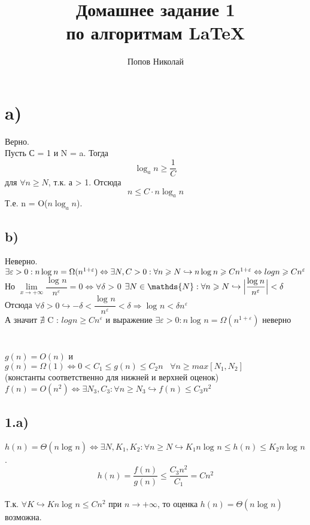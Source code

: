 \documentclass[a4paper,12pt]{article} %
\author{Попов Николай}
\title{Домашнее задание 1\\ по алгоритмам \LaTeX{}}
\begin{document}

\maketitle 
\newpage 

\section{a)}
Верно. \\
	Пусть С = 1 и N = a. Тогда 
	\[\log_{a}{n}\geqslant \dfrac{1}{C}\]
	для $\forall n\geqslant N$, т.к. а > 1.
	Отсюда \[n\leqslant C \cdot n\log_{a}{n}\]
	Т.е. n = O($n\log_{a}{n}$).

\subsection*{b)}
Неверно.\\
$\exists\varepsilon > 0: n\log_{}{n} = \Omega(n^{1+\varepsilon}) \Leftrightarrow \exists N,C > 0 : \forall n \geqslant N \hookrightarrow \\ n\log_{}{n} \geqslant C n^{1+\varepsilon} \Leftrightarrow log_{}{n} \geqslant C n^{\varepsilon}$\\
Но $\lim\limits_{x\to +\infty}\dfrac{\log_{}{n}}{n^\varepsilon} = 0 \Leftrightarrow \forall\delta$ > 0 $\exists N \in \mathds{N}  :\forall n\geqslant N \hookrightarrow \Bigl|\dfrac{\log_{}{n}}{n^\varepsilon}\Bigr|
< \delta$ \\
Отсюда $\forall\delta > 0 \hookrightarrow -\delta < \dfrac{\log_{}{n}}{n^\varepsilon} < \delta \Rightarrow \log_{}{n} < \delta n^\varepsilon$\\
 А значит $ \nexists$ C : $log_{}{n} \geqslant C n^{\varepsilon}$ и выражение $\exists\varepsilon > 0: n\log_{}{n} = \Omega(n^{1+\varepsilon})$ неверно

\section{}
$ g(n)= O(n)$ и $ g(n) = \Omega(1)\Leftrightarrow 0 < C_{1} \leqslant g(n) \leqslant C_{2} n \hspace{10pt} \forall n \geqslant max[N_{1},N_{2}]$\\(константы соответственно для нижней и верхней оценок)\\
$f(n) = O(n^{2}) \Leftrightarrow \exists N_{3} , C_{3}: \forall n  \geqslant N_{3} \hookrightarrow f(n)\leqslant C_{3}n^{2} $
\subsection*{1.a)}
$h(n) = \Theta (n\log_{}{n})\Leftrightarrow \exists N,K_{1},K_{2}:\forall n\geqslant N \hookrightarrow K_{1} n\log_{}{n}\leqslant h(n) \leqslant K_{2} n\log_{}{n} 
$.\\
\[h(n)=\dfrac{f(n)}{g(n)} \leqslant \dfrac{C_{3}n^{2}}{C_{1}}=Cn^{2} \]
\\Т.к. $\forall K \hookrightarrow Kn\log_{}{n} \leqslant C n^2$ при $n \to +\infty$, то оценка $ h(n) = \Theta (n\log_{}{n})$ возможна.\\
\end{document}
